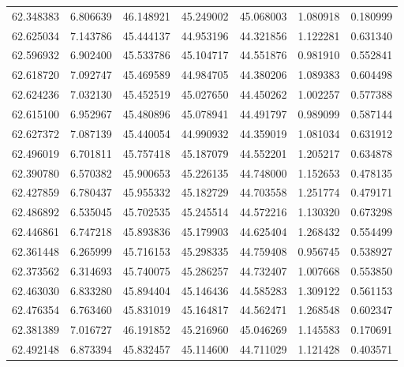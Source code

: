 \begin{tabular}{rrrrrrr}
 62.348383 &   6.806639 &         46.148921 &         45.249002 &         45.068003 &  1.080918 &  0.180999 \\
 62.625034 &   7.143786 &         45.444137 &         44.953196 &         44.321856 &  1.122281 &  0.631340 \\
 62.596932 &   6.902400 &         45.533786 &         45.104717 &         44.551876 &  0.981910 &  0.552841 \\
 62.618720 &   7.092747 &         45.469589 &         44.984705 &         44.380206 &  1.089383 &  0.604498 \\
 62.624236 &   7.032130 &         45.452519 &         45.027650 &         44.450262 &  1.002257 &  0.577388 \\
 62.615100 &   6.952967 &         45.480896 &         45.078941 &         44.491797 &  0.989099 &  0.587144 \\
 62.627372 &   7.087139 &         45.440054 &         44.990932 &         44.359019 &  1.081034 &  0.631912 \\
 62.496019 &   6.701811 &         45.757418 &         45.187079 &         44.552201 &  1.205217 &  0.634878 \\
 62.390780 &   6.570382 &         45.900653 &         45.226135 &         44.748000 &  1.152653 &  0.478135 \\
 62.427859 &   6.780437 &         45.955332 &         45.182729 &         44.703558 &  1.251774 &  0.479171 \\
 62.486892 &   6.535045 &         45.702535 &         45.245514 &         44.572216 &  1.130320 &  0.673298 \\
 62.446861 &   6.747218 &         45.893836 &         45.179903 &         44.625404 &  1.268432 &  0.554499 \\
 62.361448 &   6.265999 &         45.716153 &         45.298335 &         44.759408 &  0.956745 &  0.538927 \\
 62.373562 &   6.314693 &         45.740075 &         45.286257 &         44.732407 &  1.007668 &  0.553850 \\
 62.463030 &   6.833280 &         45.894404 &         45.146436 &         44.585283 &  1.309122 &  0.561153 \\
 62.476354 &   6.763460 &         45.831019 &         45.164817 &         44.562471 &  1.268548 &  0.602347 \\
 62.381389 &   7.016727 &         46.191852 &         45.216960 &         45.046269 &  1.145583 &  0.170691 \\
 62.492148 &   6.873394 &         45.832457 &         45.114600 &         44.711029 &  1.121428 &  0.403571 \\

\end{tabular}
